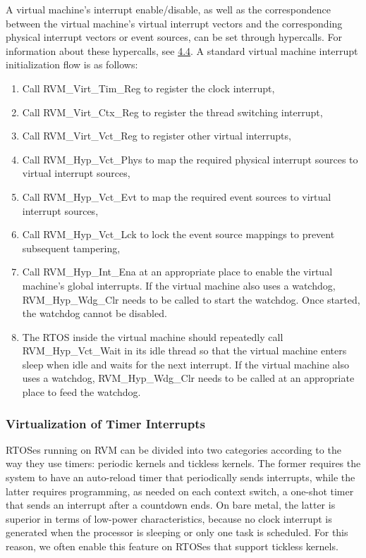 A virtual machine's interrupt enable/disable, as well as the correspondence between the virtual machine's virtual interrupt vectors and the corresponding physical interrupt vectors or event sources, can be set through hypercalls. For information about these hypercalls, see \protect\hyperref[sec:4-4]{4.4}. A standard virtual machine interrupt initialization flow is as follows:

\begin{enumerate}
\def\labelenumi{{[}\arabic{enumi}{]}}
\item
  Call RVM\_Virt\_Tim\_Reg to register the clock interrupt,
\item
  Call RVM\_Virt\_Ctx\_Reg to register the thread switching interrupt,
\item
  Call RVM\_Virt\_Vct\_Reg to register other virtual interrupts,
\item
  Call RVM\_Hyp\_Vct\_Phys to map the required physical interrupt sources to virtual interrupt sources,
\item
  Call RVM\_Hyp\_Vct\_Evt to map the required event sources to virtual interrupt sources,
\item
  Call RVM\_Hyp\_Vct\_Lck to lock the event source mappings to prevent subsequent tampering,
\item
  Call RVM\_Hyp\_Int\_Ena at an appropriate place to enable the virtual machine's global interrupts. If the virtual machine also uses a watchdog, RVM\_Hyp\_Wdg\_Clr needs to be called to start the watchdog. Once started, the watchdog cannot be disabled.
\item
  The RTOS inside the virtual machine should repeatedly call RVM\_Hyp\_Vct\_Wait in its idle thread so that the virtual machine enters sleep when idle and waits for the next interrupt. If the virtual machine also uses a watchdog, RVM\_Hyp\_Wdg\_Clr needs to be called at an appropriate place to feed the watchdog.
\end{enumerate}

\subsubsection{Virtualization of Timer Interrupts}\label{subsubsec:2-2-4-1}

RTOSes running on RVM can be divided into two categories according to the way they use timers: periodic kernels and tickless kernels. The former requires the system to have an auto-reload timer that periodically sends interrupts, while the latter requires programming, as needed on each context switch, a one-shot timer that sends an interrupt after a countdown ends. On bare metal, the latter is superior in terms of low-power characteristics, because no clock interrupt is generated when the processor is sleeping or only one task is scheduled. For this reason, we often enable this feature on RTOSes that support tickless kernels.

